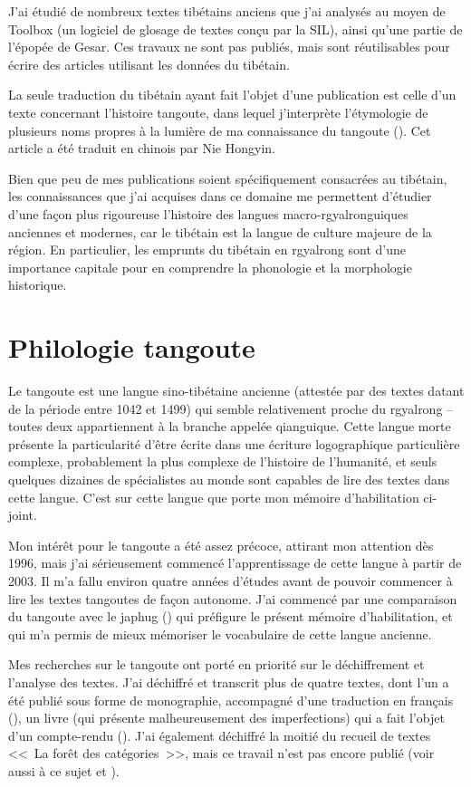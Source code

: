 \documentclass[oldfontcommands,oneside,a4paper,11pt]{memoir}
\begin{document}
J’ai étudié de nombreux textes tibétains anciens que j’ai analysés au moyen de Toolbox (un logiciel de glosage de textes conçu par la SIL), ainsi qu'une partie de l'épopée de Gesar. Ces travaux ne sont pas publiés, mais sont réutilisables pour écrire des articles utilisant les données du tibétain.

La seule traduction du tibétain ayant fait l’objet d’une publication est celle d’un texte concernant l’histoire tangoute, dans lequel j’interprète l’étymologie de plusieurs noms propres à la lumière de ma connaissance du tangoute (\citealt{jacques08debther}). Cet article a été traduit en chinois par Nie Hongyin.

Bien que peu de mes publications soient spécifiquement consacrées au tibétain, les connaissances que j’ai acquises dans ce domaine me permettent d’étudier d’une façon plus rigoureuse l’histoire des langues macro-rgyalronguiques anciennes et modernes, car le tibétain est la langue de culture majeure de la région. En particulier, les emprunts du tibétain en rgyalrong sont d'une importance capitale pour en comprendre la phonologie et la morphologie historique.

\section{Philologie tangoute}
	Le tangoute est une langue sino-tibétaine ancienne (attestée par des textes datant de la période entre 1042 et 1499) qui semble relativement proche du rgyalrong – toutes deux appartiennent à la branche appelée qianguique. Cette langue morte présente la particularité d’être écrite dans une écriture logographique particulière complexe, probablement la plus complexe de l’histoire de l’humanité, et seuls quelques dizaines de spécialistes au monde sont capables de lire des textes dans cette langue. C'est sur cette langue que porte mon mémoire d'habilitation ci-joint.
	
	Mon intérêt pour le tangoute a été assez précoce, attirant mon attention dès 1996, mais j'ai sérieusement commencé l'apprentissage de cette langue à partir de 2003. Il m'a fallu environ quatre années d'études avant de pouvoir commencer à lire les textes tangoutes de façon autonome. J'ai commencé par une comparaison du tangoute avec le japhug (\citealt{jacques06comparaison}) qui préfigure le présent mémoire d'habilitation, et qui m'a permis de mieux mémoriser le vocabulaire de cette langue ancienne.
	
	Mes recherches sur le tangoute ont porté en priorité sur le déchiffrement et l’analyse des textes. J’ai déchiffré et transcrit plus de quatre textes, dont l’un a été publié sous forme de monographie, accompagné d’une traduction en français (\citealt{jacques07textes}), un livre (qui présente malheureusement des imperfections) qui a fait l'objet d'un compte-rendu (\citealt{zaitsev09}). J'ai également déchiffré la moitié du recueil de textes <<~La forêt des catégories~>>, mais ce travail n'est pas encore publié (voir aussi à ce sujet \citet{kepping83} et \citet{leilin90}).
	
\end{document}
